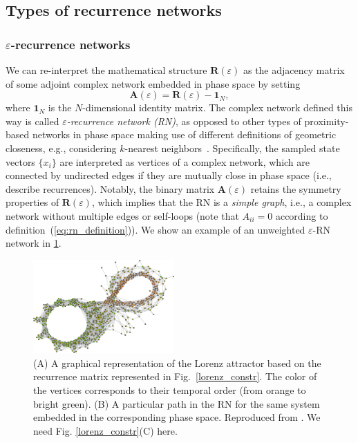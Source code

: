 
	\subsection{Types of recurrence networks}
		\subsubsection{$\varepsilon$-recurrence networks}
		We can re-interpret the mathematical structure $\textbf{R}(\varepsilon)$ as the adjacency matrix of some adjoint complex network embedded in phase space by setting
\begin{equation}
\mathbf{A}(\varepsilon)=\mathbf{R}(\varepsilon)-\mathbf{1}_N,
\label{eq:rn_definition}
\end{equation}
\noindent
where $\mathbf{1}_N$ is the $N$-dimensional identity matrix. The complex network defined this way is called \emph{$\varepsilon$-recurrence network (RN)}, as opposed to other types of proximity-based networks in phase space making use of different definitions of geometric closeness, e.g., considering $k$-nearest neighbors~\cite{Donner2011}. Specifically, the sampled state vectors $\{x_i\}$ are interpreted as vertices of a complex network, which are connected by undirected edges if they are mutually close in phase space (i.e., describe recurrences). Notably, the binary matrix $\mathbf{A}(\varepsilon)$ retains the symmetry properties of $\mathbf{R}(\varepsilon)$, which implies that the RN is a \emph{simple graph}, i.e., a complex network without multiple edges or self-loops (note that $A_{ii}=0$ according to definition~(\ref{eq:rn_definition})). We show an example of an unweighted  $\varepsilon$-RN network in \ref{lorenz_net}. 
\begin{figure}[thb]
	\centering
	\includegraphics[width=0.48\textwidth]{Chapter03_RecurrenceNt/lorenz_net.eps}
\caption{(A) A graphical representation of the Lorenz attractor based on the recurrence matrix represented in Fig.~\ref{lorenz_constr}. The color of the vertices corresponds to their temporal order (from orange to bright green). (B) A particular path in the RN for the same system embedded in the corresponding phase space. Reproduced from \cite{Donner2011}. {\color{red}We need Fig. \ref{lorenz_constr}(C) here. }}
\label{lorenz_net}
\end{figure}

